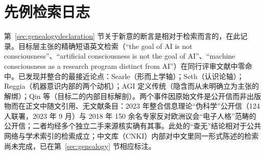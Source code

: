 \documentclass[10pt,fontset=fandol]{ctexart}
\begin{document}
\appendix
\section{先例检索日志}\label{sec:appendix-absence}

第~\ref{sec:genealogydeclaration} 节关于新意的断言是相对于检索而言的，在此记录。目标层主张的精确短语英文检索（“the goal of AI is not consciousness”、“artificial consciousness is not the goal of AI”、“machine consciousness as a research program distinct from AI”）在同行评审文献中零命中。已发现并整合的最接近论点：Searle\cite{searle1980}（形而上学轴）；Seth\cite{seth2025conscious}（认识论轴）；Reggia\cite{reggia2013rise}（机器意识内部的两个动机）；AGI 定义传统\cite{goertzel2007agi}（隐含而从未明确立为主张的解绑）；Qin 等\cite{qin2025taxonomy}（目标二的内部目标解剖）。两个事件因原始文件是公开信而非出版物而在正文中随文引用、无文献条目：2023 年整合信息理论“伪科学”公开信（124 人联署，2023 年 9 月）与 2018 年 150 余名专家反对欧洲议会“电子人格”范畴的公开信\cite{eu2018letter}；二者均经多个独立二手来源核实确有其事。此处的“查无”结论相对于公共网络与学术索引的检索成立；中文库（CNKI）内部对中文里同一形式陈述的检索尚未完成，已在第~\ref{sec:genealogy} 节相应标注。
\end{document}
